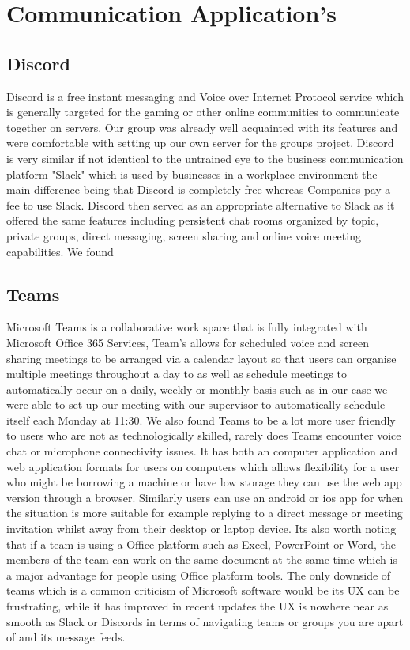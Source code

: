 \section{Communication Application's}
\subsection{Discord}
Discord is a free instant messaging and Voice over Internet Protocol service which is generally targeted for the gaming or other online communities to communicate together on servers. Our group was already well acquainted with its features and were comfortable with setting up our own server for the groups project. Discord is very similar if not identical to the untrained eye to the business communication platform "Slack" which is used by businesses in a workplace environment the main difference being that Discord is completely free whereas Companies pay a fee to use Slack. Discord then served as an appropriate alternative to Slack as it offered the same features including persistent chat rooms organized by topic, private groups, direct messaging, screen sharing and online voice meeting capabilities.
\newline
\newline
We found
\subsection{Teams}
Microsoft Teams is a collaborative work space that is fully integrated with Microsoft Office 365 Services, Team's allows for scheduled voice and screen sharing meetings to be arranged via a calendar layout so that users can organise multiple meetings throughout a day to as well as schedule meetings to automatically occur on a daily, weekly or monthly basis such as in our case we were able to set up our meeting with our supervisor to automatically schedule itself each Monday at 11:30.
\newline
\newline
We also found Teams to be a lot more user friendly to users who are not as technologically skilled, rarely does Teams encounter voice chat or microphone connectivity issues. It has both an computer application and web application formats for users on computers which allows flexibility for a user who might be borrowing a machine or have low storage they can use the web app version through a browser.
\newline
\newline
Similarly users can use an android or ios app for when the situation is more suitable for example replying to a direct message or meeting invitation whilst away from their desktop or laptop device. Its also worth noting that if a team is using a Office platform such as Excel, PowerPoint or Word, the members of the team can work on the same document at the same time which is a major advantage for people using Office platform tools. The only downside of teams which is a common criticism of Microsoft software would be its UX can be frustrating, while it has improved in recent updates the UX is nowhere near as smooth as Slack or Discords in terms of navigating teams or groups you are apart of and its message feeds.

